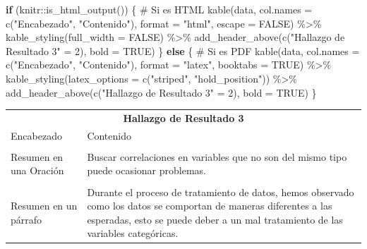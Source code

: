 \documentclass[
  letterpaper,
  DIV=11,
  numbers=noendperiod]{scrreprt}
\newenvironment{Shaded}{\begin{snugshade}}{\end{snugshade}}
\newcommand{\AttributeTok}[1]{\textcolor[rgb]{0.40,0.45,0.13}{#1}}
\newcommand{\CommentTok}[1]{\textcolor[rgb]{0.37,0.37,0.37}{#1}}
\newcommand{\ConstantTok}[1]{\textcolor[rgb]{0.56,0.35,0.01}{#1}}
\newcommand{\ControlFlowTok}[1]{\textcolor[rgb]{0.00,0.23,0.31}{\textbf{#1}}}
\newcommand{\DecValTok}[1]{\textcolor[rgb]{0.68,0.00,0.00}{#1}}
\newcommand{\FunctionTok}[1]{\textcolor[rgb]{0.28,0.35,0.67}{#1}}
\newcommand{\NormalTok}[1]{\textcolor[rgb]{0.00,0.23,0.31}{#1}}
\newcommand{\OtherTok}[1]{\textcolor[rgb]{0.00,0.23,0.31}{#1}}
\newcommand{\SpecialCharTok}[1]{\textcolor[rgb]{0.37,0.37,0.37}{#1}}
\newcommand{\StringTok}[1]{\textcolor[rgb]{0.13,0.47,0.30}{#1}}
\begin{document}
\begin{Shaded}
\begin{Highlighting}[]
\ControlFlowTok{if}\NormalTok{ (knitr}\SpecialCharTok{::}\FunctionTok{is\_html\_output}\NormalTok{()) \{}
  \CommentTok{\# Si es HTML}
  \FunctionTok{kable}\NormalTok{(data, }\AttributeTok{col.names =} \FunctionTok{c}\NormalTok{(}\StringTok{"Encabezado"}\NormalTok{, }\StringTok{"Contenido"}\NormalTok{), }
        \AttributeTok{format =} \StringTok{"html"}\NormalTok{, }
        \AttributeTok{escape =} \ConstantTok{FALSE}\NormalTok{) }\SpecialCharTok{\%\textgreater{}\%}
    \FunctionTok{kable\_styling}\NormalTok{(}\AttributeTok{full\_width =} \ConstantTok{FALSE}\NormalTok{) }\SpecialCharTok{\%\textgreater{}\%}
    \FunctionTok{add\_header\_above}\NormalTok{(}\FunctionTok{c}\NormalTok{(}\StringTok{"Hallazgo de Resultado 3"} \OtherTok{=} \DecValTok{2}\NormalTok{), }\AttributeTok{bold =} \ConstantTok{TRUE}\NormalTok{)}
\NormalTok{\} }\ControlFlowTok{else}\NormalTok{ \{}
  \CommentTok{\# Si es PDF}
  \FunctionTok{kable}\NormalTok{(data, }\AttributeTok{col.names =} \FunctionTok{c}\NormalTok{(}\StringTok{"Encabezado"}\NormalTok{, }\StringTok{"Contenido"}\NormalTok{), }
        \AttributeTok{format =} \StringTok{"latex"}\NormalTok{, }
        \AttributeTok{booktabs =} \ConstantTok{TRUE}\NormalTok{) }\SpecialCharTok{\%\textgreater{}\%}
    \FunctionTok{kable\_styling}\NormalTok{(}\AttributeTok{latex\_options =} \FunctionTok{c}\NormalTok{(}\StringTok{"striped"}\NormalTok{, }\StringTok{"hold\_position"}\NormalTok{)) }\SpecialCharTok{\%\textgreater{}\%}
    \FunctionTok{add\_header\_above}\NormalTok{(}\FunctionTok{c}\NormalTok{(}\StringTok{"Hallazgo de Resultado 3"} \OtherTok{=} \DecValTok{2}\NormalTok{), }\AttributeTok{bold =} \ConstantTok{TRUE}\NormalTok{)}
\NormalTok{\}}
\end{Highlighting}
\end{Shaded}

\begin{table}[!h]
\centering
\begin{tabular}{ll}
\toprule
\multicolumn{2}{c}{\textbf{Hallazgo de Resultado 3}} \\
\cmidrule(l{3pt}r{3pt}){1-2}
Encabezado & Contenido\\
\midrule
\cellcolor{gray!10}{Nombre de Su hallazgo} & \cellcolor{gray!10}{Dificultad a la hora de trabajar con variables categóricas y numéricas.}\\
Resumen en una Oración & Buscar correlaciones en variables que no son del mismo tipo puede ocasionar problemas.\\
\cellcolor{gray!10}{Problemas o Posibles Desafíos} & \cellcolor{gray!10}{A la hora de tratar variables categóricas con variables numéricas, se puede estar perdiendo información, debido a que muchas de las técnicas normalmente utilizadas son para variables numéricas.}\\
Resumen en un párrafo & Durante el proceso de tratamiento de datos, hemos observado como los datos se comportan de maneras diferentes a las esperadas, esto se puede deber a un mal tratamiento de las variables categóricas.\\
\bottomrule
\end{tabular}
\end{table}
\end{document}
